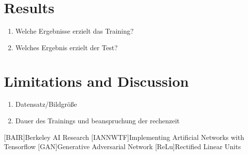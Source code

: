 \documentclass[fleqn,10pt]{SelfArx} %
\begin{document}

\section{Results}

\begin{enumerate}[noitemsep] %
	\item Welche Ergebnisse erzielt das Training?
	\item Welches Ergebnis erzielt der Test?
\end{enumerate}



\section{Limitations and Discussion}

\begin{enumerate}[noitemsep] %
	\item Datensatz/Bildgröße
	\item Dauer des Trainings und beanspruchung der rechenzeit
\end{enumerate}





\begin{acronym}
[BAIR]{Berkeley AI Research}
[IANNWTF]{Implementing Artificial Networks with Tensorflow}
[GAN]{Generative Adversarial Network}
[ReLu]{Rectified Linear Units}
\end{acronym}

\end{document}
